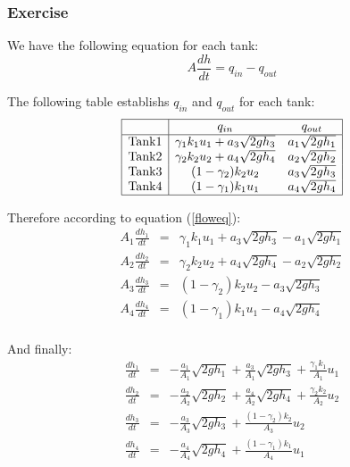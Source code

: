 \subsubsection{Exercise} 

We have the following equation for each tank:
\begin{equation}
A \frac{dh}{dt} = q_{in} - q_{out} 
\label{floweq}
\end{equation}

The following table establishs $q_{in}$ and $q_{out}$ for each tank:
$$
\begin{array}{|c|cc|}
    \hline
    & q_{in} & q_{out} \\
    \hline
    \text{Tank} 1 & \gamma_1k_1u_1+a_3\sqrt{2gh_3} & a_1\sqrt{2gh_1} \\
    \text{Tank} 2 & \gamma_2k_2u_2+a_4\sqrt{2gh_4} & a_2\sqrt{2gh_2} \\
    \text{Tank} 3 & (1-\gamma_2)k_2u_2 & a_3\sqrt{2gh_3} \\ 
    \text{Tank} 4 & (1-\gamma_1)k_1u_1 & a_4\sqrt{2gh_4} \\ 
    \hline
\end{array}
$$

Therefore according to equation (\ref{floweq}): 
$$
    \begin{array}{rcl}
    A_1 \frac{dh_1}{dt} & = &
        \gamma_1k_1u_1+a_3\sqrt{2gh_3} - a_1\sqrt{2gh_1} \\
    A_2 \frac{dh_2}{dt} & = &
        \gamma_2k_2u_2+a_4\sqrt{2gh_4} - a_2\sqrt{2gh_2} \\
    A_3 \frac{dh_3}{dt} & = &
        (1-\gamma_2)k_2u_2 - a_3\sqrt{2gh_3} \\ 
    A_4 \frac{dh_4}{dt} & = &
    (1-\gamma_1)k_1u_1 - a_4\sqrt{2gh_4} \\ 
    \end{array}
$$

And finally:
\begin{equation}
    \boxed{
        \begin{array}{rcl}
    \frac{dh_1}{dt} & = &
            - \frac{a_1}{A_1}\sqrt{2gh_1} + \frac{a_3}{A_1}\sqrt{2gh_3} + \frac{\gamma_1k_1}{A_1}u_1\\ 

    \frac{dh_2}{dt} & = &
            - \frac{a_2}{A_2}\sqrt{2gh_2} + \frac{a_4}{A_2}\sqrt{2gh_4} + \frac{\gamma_2k_2}{A_2}u_2\\ 

    \frac{dh_3}{dt} & = &
            -\frac{a_3}{A_3}\sqrt{2gh_3}+\frac{(1-\gamma_2)k_2}{A_3}u_2 \\ 

    \frac{dh_4}{dt} & = &
            -\frac{a_4}{A_4}\sqrt{2gh_4}+\frac{(1-\gamma_1)k_1}{A_4}u_1 \\ 
        \end{array}
    \label{tanksyseq}
}
\end{equation}

